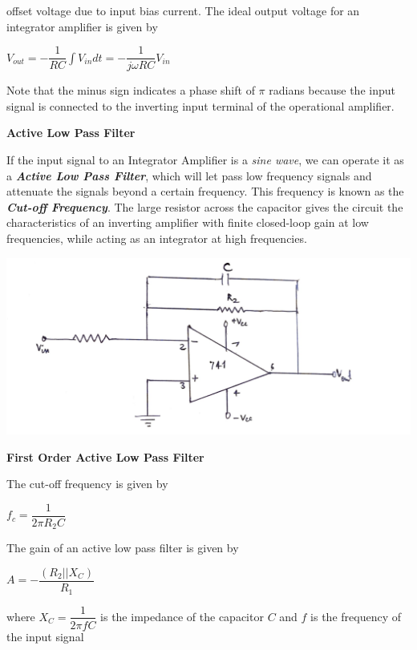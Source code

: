 offset voltage due to input bias current. 
\noindent The ideal output voltage for an integrator amplifier is given by
\begin{center}
    $V_{out} = -\dfrac{1}{RC} \int V_{in} dt = - \dfrac{1}{j \omega RC}V_{in}$
\end{center}
\par
\noindent Note that the minus sign indicates a phase shift of $\pi$ radians because the input signal is connected to the inverting input terminal of the operational amplifier. 
\newline
\begin{center}
    \textbf{\large Active Low Pass Filter}
\end{center}
\noindent If the input signal to an Integrator Amplifier is a \emph{sine wave}, we can operate it as a \textbf{\emph{Active Low Pass Filter}}, which will let pass low frequency signals and attenuate the signals beyond a certain frequency. This frequency is known as the \textbf{\emph{Cut-off Frequency}}. The large resistor across the capacitor gives the circuit the characteristics of an inverting amplifier with finite closed-loop gain at low frequencies, while acting as an integrator at high frequencies.
\begin{center}
    \includegraphics[scale = 0.15]{Documents/filter.jpg}
\end{center}
\begin{center}
    \textbf{First Order Active Low Pass Filter}
\end{center}
The cut-off frequency is given by
\begin{center}
    $f_c = \dfrac{1}{2 \pi R_2 C}$
\end{center}
The gain of an active low pass filter is given by
\begin{center}
    $A = - \dfrac{(R_2 || X_C)}{R_1}$ 
\end{center}
where $X_C = \dfrac{1}{2 \pi f C}$ is the impedance of the capacitor $C$ and $f$ is the frequency of the input signal 
